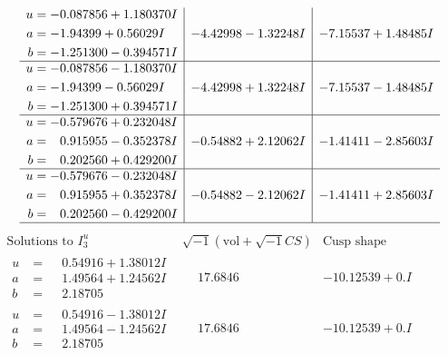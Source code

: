 \documentclass[1p]{elsarticle_modified}
\theoremstyle{definition}
\newcommand{\I}{\sqrt{-1}}
\begin{document}
$$\begin{array}{c|c|c}
\begin{aligned}
u &= -0.087856 + 1.180370 I \\
a &= -1.94399 + 0.56029 I \\
b &= -1.251300 - 0.394571 I\end{aligned}
 & -4.42998 - 1.32248 I & -7.15537 + 1.48485 I \\ \hline\begin{aligned}
u &= -0.087856 - 1.180370 I \\
a &= -1.94399 - 0.56029 I \\
b &= -1.251300 + 0.394571 I\end{aligned}
 & -4.42998 + 1.32248 I & -7.15537 - 1.48485 I \\ \hline\begin{aligned}
u &= -0.579676 + 0.232048 I \\
a &= \phantom{-}0.915955 - 0.352378 I \\
b &= \phantom{-}0.202560 + 0.429200 I\end{aligned}
 & -0.54882 + 2.12062 I & -1.41411 - 2.85603 I \\ \hline\begin{aligned}
u &= -0.579676 - 0.232048 I \\
a &= \phantom{-}0.915955 + 0.352378 I \\
b &= \phantom{-}0.202560 - 0.429200 I\end{aligned}
 & -0.54882 - 2.12062 I & -1.41411 + 2.85603 I\\
 \hline 
 \end{array}$$\newpage$$\begin{array}{c|c|c}  
\text{Solutions to }I^u_{3}& \I (\text{vol} + \sqrt{-1}CS) & \text{Cusp shape}\\
 \hline 
\begin{aligned}
u &= \phantom{-}0.54916 + 1.38012 I \\
a &= \phantom{-}1.49564 + 1.24562 I \\
b &= \phantom{-}2.18705\phantom{ +0.000000I}\end{aligned}
 & \phantom{-}17.6846\phantom{ +0.000000I} & -10.12539 + 0. I\phantom{ +0.000000I} \\ \hline\begin{aligned}
u &= \phantom{-}0.54916 - 1.38012 I \\
a &= \phantom{-}1.49564 - 1.24562 I \\
b &= \phantom{-}2.18705\phantom{ +0.000000I}\end{aligned}
 & \phantom{-}17.6846\phantom{ +0.000000I} & -10.12539 + 0. I\phantom{ +0.000000I} \\ \hline\begin{aligned}

\end{aligned}
\end{array}$$
\end{document}
